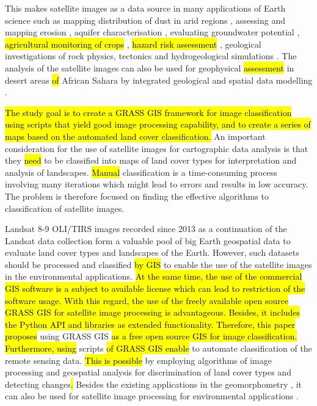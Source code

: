 \documentclass[asi,article,submit,pdftex,moreauthors]{Definitions/mdpi}
\begin{document}
This makes satellite images as a data source in many applications of Earth science such as mapping distribution of dust in arid regions \cite{Parajuli}, assessing and mapping erosion \cite{Mihi}, aquifer characterisation \cite{AOUDIA2020103920}, evaluating groundwater potential \cite{Derdour}, \hl{agricultural monitoring of crops} \cite{Benami,Butte,Daughtry,DAUGHTRY2000229}, \hl{hazard risk assessment} \cite{KUCHARCZYK2021112577}, geological investigations of rock physics, tectonics and hydrogeological simulations \cite{NEDJRAOUI2021104348}. The analysis of the satellite images can also be used for geophysical \hl{assessment} in\hl{ }desert areas \hl{of} African Sahara by integrated geological and\hl{ }spatial data modelling\hl{ }\cite{ZERROUK2017146}. 

\hl{The study goal is to create a GRASS GIS framework for image classification using scripts that yield good image processing capability, and to create a series of maps based on the automated land cover classification. }An important consideration for the use of satellite images for cartographic data analysis is that they \hl{need} to be classified into maps of land cover types for interpretation and analysis of landscapes. \hl{Manual }classification is a time-consuming process involving many iterations which might lead to errors and results in low accuracy. The problem is therefore focused on finding the effective algorithms to classification of satellite images.

Landsat 8-9 OLI/TIRS images recorded since 2013 as a continuation of the Landsat data collection form a valuable pool of big Earth geospatial data to evaluate land cover types and landscapes of the Earth. However, such datasets should be processed and classified \hl{by GIS }to enable the use of the satellite images in the environmental applications. \hl{At the same time, the use of the commercial GIS software is a subject to available license which can lead to restriction of the software usage. With this regard, the use of the freely available open source GRASS GIS for satellite image processing is advantageous. Besides, it includes the Python API and libraries as extended functionality. Therefore, this paper proposes}  using GRASS GIS \hl{as a free open source GIS for image classification. Furthermore, using} scripts \hl{of GRASS GIS enable }to automate classification of the remote sensing data. \hl{This is possible }by employing algorithms of image processing and geospatial analysis for discrimination of land cover types and detecting changes\hl{. }Besides the existing applications in the geomorphometry \cite{HOFIERKA2009387}, it can also be used for satellite image processing for environmental applications \cite{Lemenkova202125}.
\end{document}
